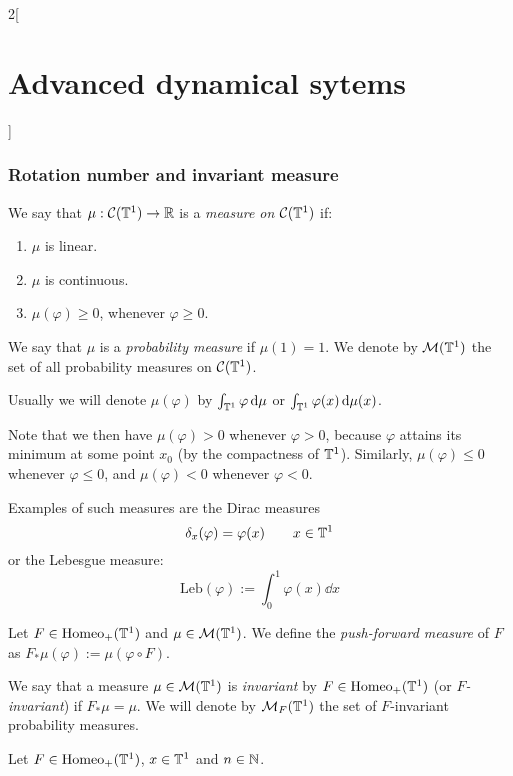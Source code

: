 \documentclass[../../../main_math.tex]{subfiles}
\begin{document}
\begin{multicols}{2}[\section{Advanced dynamical sytems}]
  \subsubsection{Rotation number and invariant measure}
  \begin{definition}
    We say that $\mu:\mathcal{C}(\mathbb{T}^1)\to\mathbb{R}$ is a \emph{measure on $\mathcal{C}(\mathbb{T}^1)$} if:
    \begin{enumerate}
      \item $\mu$ is linear.
      \item $\mu$ is continuous.
      \item $\mu(\varphi)\geq 0$, whenever $\varphi\geq 0$.
    \end{enumerate}
    We say that $\mu$ is a \emph{probability measure} if $\mu(1)=1$. We denote by $\mathcal{M}(\mathbb{T}^1)$ the set of all probability measures on $\mathcal{C}(\mathbb{T}^1)$.
  \end{definition}
  \begin{remark}
    Usually we will denote $\mu(\varphi)$ by $\int_{\mathbb{T}^1}\varphi\dd{\mu}$ or $\int_{\mathbb{T}^1}\varphi(x)\dd{\mu(x)}$.
  \end{remark}
  \begin{remark}
    Note that we then have $\mu(\varphi)>0$ whenever $\varphi>0$, because $\varphi$ attains its minimum at some point $x_0$ (by the compactness of $\mathbb{T}^1$). Similarly, $\mu(\varphi)\leq 0$ whenever $\varphi\leq 0$, and $\mu(\varphi)<0$ whenever $\varphi<0$.
  \end{remark}
  \begin{remark}
    Examples of such measures are the Dirac measures
    $$\delta_x(\varphi)=\varphi(x)\qquad x\in \mathbb{T}^1$$
    or the Lebesgue measure:
    $$\text{Leb}(\varphi):=\int_{0}^1\varphi(x)\dd{x}$$
  \end{remark}
  \begin{definition}
    Let $F\in \mathrm{Homeo}_+(\mathbb{T}^1)$ and $\mu\in \mathcal{M}(\mathbb{T}^1)$. We define the \emph{push-forward measure} of $F$ as $F_*\mu(\varphi):=\mu(\varphi\circ F)$.
  \end{definition}
  \begin{definition}
    We say that a measure $\mu\in\mathcal{M}(\mathbb{T}^1)$ is \emph{invariant} by $F\in\mathrm{Homeo}_+(\mathbb{T}^1)$ (or \emph{$F$-invariant}) if $F_*\mu=\mu$. We will denote by $\mathcal{M}_F(\mathbb{T}^1)$ the set of $F$-invariant probability measures.
  \end{definition}
  \begin{proposition}
    Let $F\in \mathrm{Homeo}_+(\mathbb{T}^1)$, $x\in\mathbb{T}^1$ and $n\in\mathbb{N}$.

\end{proposition}
\end{multicols}
\end{document}
